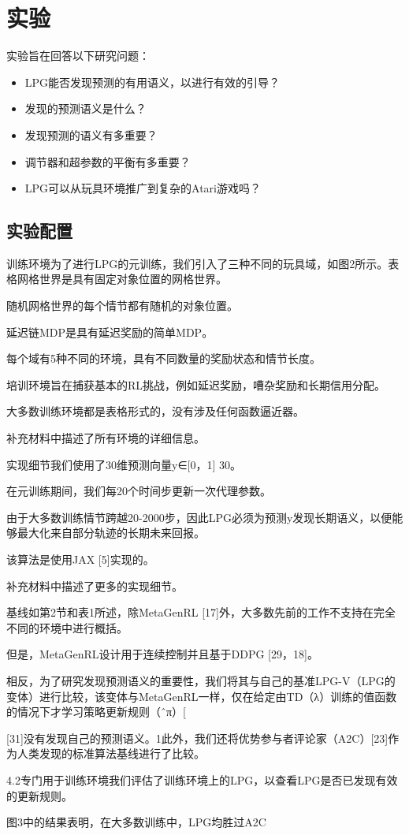 \chapter{实验}
\label{cha:method}



实验旨在回答以下研究问题：
\begin{itemize}
    \item LPG能否发现预测的有用语义，以进行有效的引导？
    \item 发现的预测语义是什么？ 
    \item 发现预测的语义有多重要？ 
    \item 调节器和超参数的平衡有多重要？ 
    \item LPG可以从玩具环境推广到复杂的Atari游戏吗？ 
\end{itemize}

\section{实验配置}
训练环境为了进行LPG的元训练，我们引入了三种不同的玩具域，如图2所示。表格网格世界是具有固定对象位置的网格世界。

随机网格世界的每个情节都有随机的对象位置。

延迟链MDP是具有延迟奖励的简单MDP。

每个域有5种不同的环境，具有不同数量的奖励状态和情节长度。

培训环境旨在捕获基本的RL挑战，例如延迟奖励，嘈杂奖励和长期信用分配。

大多数训练环境都是表格形式的，没有涉及任何函数逼近器。

补充材料中描述了所有环境的详细信息。

实现细节我们使用了30维预测向量y∈[0，1] 30。

在元训练期间，我们每20个时间步更新一次代理参数。

由于大多数训练情节跨越20-2000步，因此LPG必须为预测y发现长期语义，以便能够最大化来自部分轨迹的长期未来回报。

该算法是使用JAX [5]实现的。

补充材料中描述了更多的实现细节。

基线如第2节和表1所述，除MetaGenRL [17]外，大多数先前的工作不支持在完全不同的环境中进行概括。

但是，MetaGenRL设计用于连续控制并且基于DDPG [29，18]。

相反，为了研究发现预测语义的重要性，我们将其与自己的基准LPG-V（LPG的变体）进行比较，该变体与MetaGenRL一样，仅在给定由TD（λ）训练的值函数的情况下才学习策略更新规则（ˆπ）[ 

[31]没有发现自己的预测语义。1此外，我们还将优势参与者评论家（A2C）[23]作为人类发现的标准算法基线进行了比较。 

4.2专门用于训练环境我们评估了训练环境上的LPG，以查看LPG是否已发现有效的更新规则。

图3中的结果表明，在大多数训练中，LPG均胜过A2C
